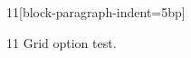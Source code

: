 \documentclass[paper=A4]{ropas-poster}
\begin{document}
\begin{postergrid}{1}{1}[block-paragraph-indent=5bp]
\begin{posterblock}{1}{1}
Grid option test.
\end{posterblock}
\end{postergrid}
\end{document}
